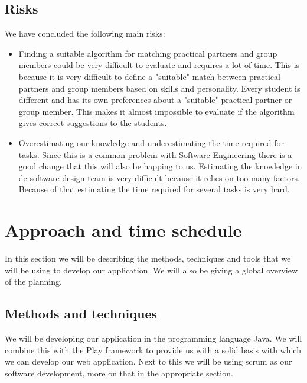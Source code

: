 \subsection*{Risks}
We have concluded the following main risks:

\begin{itemize}
\item Finding a suitable algorithm for matching practical partners and group members could be very difficult to evaluate and requires a lot of time.
This is because it is very difficult to define a "suitable" match between practical partners and group members based on skills and personality.
Every student is different and has its own preferences about a "suitable" practical partner or group member.
This makes it almost impossible to evaluate if the algorithm gives correct suggestions to the students.

\item Overestimating our knowledge and underestimating the time required for tasks.
Since this is a common problem with Software Engineering there is a good change that this will also be happing to us.
Estimating the knowledge in de software design team is very difficult because it relies on too many factors.
Because of that estimating the time required for several tasks is very hard.
\end{itemize}

\section*{Approach and time schedule}
In this section we will be describing the methods, techniques and tools that we will be using to develop our application.
We will also be giving a global overview of the planning.

\subsection*{Methods and techniques}
We will be developing our application in the programming language Java.
We will combine this with the Play framework to provide us with a solid basis with which we can develop our web application.
Next to this we will be using scrum as our software development, more on that in the appropriate section.

